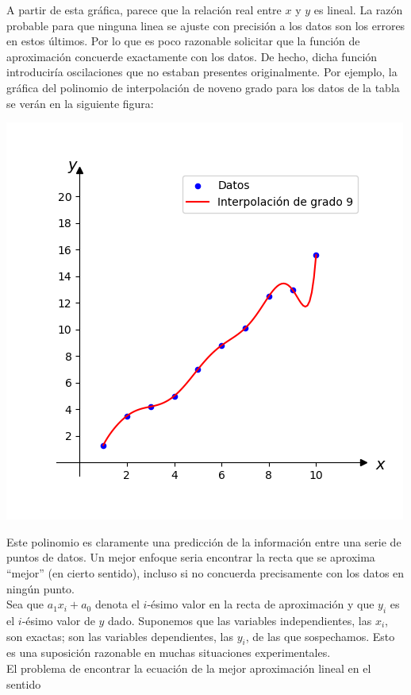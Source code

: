 A partir de esta gráfica, parece que la relación real entre $x$ y $y$ es lineal. La razón probable para que ninguna linea se ajuste con precisión a los datos son los errores en estos últimos. Por lo que es poco razonable solicitar que la función de aproximación concuerde exactamente con los datos. De hecho, dicha función introduciría oscilaciones que no estaban presentes originalmente. Por ejemplo, la gráfica del polinomio de interpolación de noveno grado para los datos de la tabla se verán en la siguiente figura:
\begin{center}
  \includegraphics[scale=1]{chapters/chapter02/scripts/tabla-interpolacion.png}
\end{center}
Este polinomio es claramente una predicción de la información entre una serie de puntos de datos. Un mejor enfoque seria encontrar la recta que se aproxima “mejor” (en cierto sentido), incluso si no concuerda precisamente con los datos en ningún punto.\\
Sea que $a_1x_i+a_0$ denota el $i$-ésimo valor en la recta de aproximación y que $y_i$ es el $i$-ésimo valor de $y$ dado. Suponemos que las variables independientes, las $x_i$, son exactas; son las variables dependientes, las $y_i$, de las que sospechamos. Esto es una suposición razonable en muchas situaciones experimentales.\\
El problema de encontrar la ecuación de la mejor aproximación lineal en el sentido
